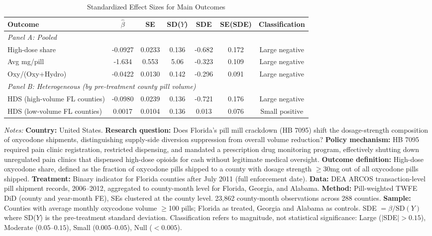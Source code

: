\begin{table}[H]
\centering
\caption{Standardized Effect Sizes for Main Outcomes}
\label{tab:sde}
\begin{threeparttable}
\begin{adjustbox}{max width=\textwidth}
\begin{tabular}{lcccccc}
\toprule
Outcome & $\hat{\beta}$ & SE & SD($Y$) & SDE & SE(SDE) & Classification \\
\midrule
\multicolumn{7}{l}{\textit{Panel A: Pooled}} \\
High-dose share & -0.0927 & 0.0233 & 0.136 & -0.682 & 0.172 & Large negative \\
Avg mg/pill & -1.634 & 0.553 & 5.06 & -0.323 & 0.109 & Large negative \\
Oxy/(Oxy+Hydro) & -0.0422 & 0.0130 & 0.142 & -0.296 & 0.091 & Large negative \\
\midrule
\multicolumn{7}{l}{\textit{Panel B: Heterogeneous (by pre-treatment county pill volume)}} \\
HDS (high-volume FL counties) & -0.0980 & 0.0239 & 0.136 & -0.721 & 0.176 & Large negative \\
HDS (low-volume FL counties) & 0.0017 & 0.0104 & 0.136 & 0.013 & 0.076 & Small positive \\
\bottomrule
\end{tabular}
\end{adjustbox}
\par\vspace{0.3em}
{\footnotesize \textit{Notes:} \textbf{Country:} United States. \textbf{Research question:} Does Florida's pill mill crackdown (HB 7095) shift the dosage-strength composition of oxycodone shipments, distinguishing supply-side diversion suppression from overall volume reduction? \textbf{Policy mechanism:} HB 7095 required pain clinic registration, restricted dispensing, and mandated a prescription drug monitoring program, effectively shutting down unregulated pain clinics that dispensed high-dose opioids for cash without legitimate medical oversight. \textbf{Outcome definition:} High-dose oxycodone share, defined as the fraction of oxycodone pills shipped to a county with dosage strength $\geq$30mg out of all oxycodone pills shipped. \textbf{Treatment:} Binary indicator for Florida counties after July 2011 (full enforcement date). \textbf{Data:} DEA ARCOS transaction-level pill shipment records, 2006--2012, aggregated to county-month level for Florida, Georgia, and Alabama. \textbf{Method:} Pill-weighted TWFE DiD (county and year-month FE), SEs clustered at the county level. 23,862 county-month observations across 288 counties. \textbf{Sample:} Counties with average monthly oxycodone volume $\geq$100 pills; Florida as treated, Georgia and Alabama as controls. SDE $= \hat{\beta} / \text{SD}(Y)$ where SD($Y$) is the pre-treatment standard deviation. Classification refers to magnitude, not statistical significance: Large ($|$SDE$| > 0.15$), Moderate ($0.05$--$0.15$), Small ($0.005$--$0.05$), Null ($< 0.005$).}
\end{threeparttable}
\end{table}
